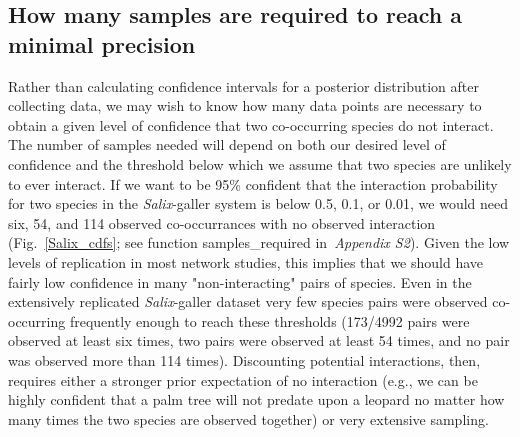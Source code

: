 \documentclass[12pt]{article}
\begin{document}
  \subsection*{How many samples are required to reach a minimal precision}

      Rather than calculating confidence intervals for a posterior distribution after collecting data, we may wish to know how many data points are necessary to obtain a given level of confidence that two co-occurring species do not interact. The number of samples needed will depend on both our desired level of confidence and the threshold below which we assume that two species are unlikely to ever interact. If we want to be 95\% confident that the interaction probability for two species in the \emph{Salix}-galler system is below 0.5, 0.1, or 0.01, we would need six, 54, and 114 observed co-occurrances with no observed interaction (Fig.~\ref{Salix_cdfs}; see function samples\_required in~\emph{Appendix S2}). Given the low levels of replication in most network studies, this implies that we should have fairly low confidence in many "non-interacting" pairs of species. Even in the extensively replicated \emph{Salix}-galler dataset very few species pairs were observed co-occurring frequently enough to reach these thresholds (173/4992 pairs were observed at least six times, two pairs were observed at least 54 times, and no pair was observed more than 114 times). Discounting potential interactions, then, requires either a stronger prior expectation of no interaction (e.g., we can be highly confident that a palm tree will not predate upon a leopard no matter how many times the two species are observed together) or very extensive sampling.
\end{document}

